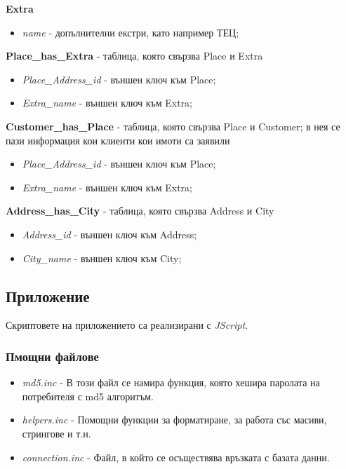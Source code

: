 \documentclass[a4paper,12pt, leqno]{article}
\begin{document}
\textbf{Extra}
\begin{itemize}
 \item \textit{name} - допълнителни екстри, като например ТЕЦ;
\end{itemize}

\textbf{Place\_has\_Extra} - таблица, която свързва Place и Extra
\begin{itemize}
 \item \textit{Place\_Address\_id} - външен ключ към Place;
 \item \textit{Extra\_name} - външен ключ към Extra;
\end{itemize}

\textbf{Customer\_has\_Place} - таблица, която свързва Place и Customer; в нея се пази информация 
кои клиенти кои имоти са заявили
\begin{itemize}
 \item \textit{Place\_Address\_id} - външен ключ към Place;
 \item \textit{Extra\_name} - външен ключ към Extra;
\end{itemize}

\textbf{Address\_has\_City} - таблица, която свързва Address и City
\begin{itemize}
 \item \textit{Address\_id} - външен ключ към Address;
 \item \textit{City\_name} - външен ключ към City;
\end{itemize}



\subsection{Приложение}
Скриптовете на приложението са реализирани с \textit{JScript}.
\subsubsection{Пмощни файлове}
\begin{itemize}
 \item \textit{md5.inc} - В този файл се намира функция, която хешира паролата на потребителя с md5 алгоритъм.
 \item \textit{helpers.inc} - Помощни функции за форматиране, за работа със масиви, стрингове и т.н.
 \item \textit{connection.inc} - Файл, в който се осъществява връзката с базата данни.
\end{itemize}
\end{document}
